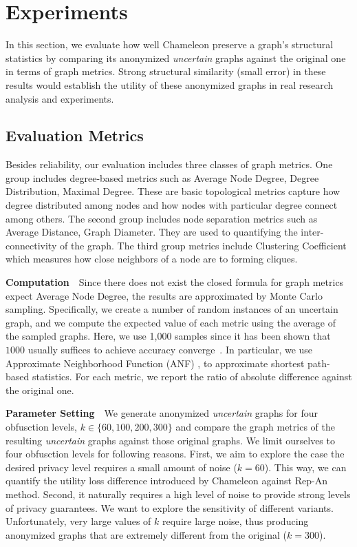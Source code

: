 \section{Experiments}
\label{sec:exp}
In this section, we evaluate how well Chameleon preserve a graph's structural statistics by comparing its anonymized \emph{uncertain} graphs against the original one in terms of graph metrics. Strong structural similarity (small error) in these results would establish the utility of these anonymized graphs in real research analysis and experiments. 

\subsection{Evaluation Metrics}
Besides reliability, our evaluation includes three classes of graph metrics. 
One group includes degree-based metrics such as Average Node Degree, Degree Distribution, Maximal Degree. These are basic topological metrics capture how degree distributed among nodes and how nodes with particular degree connect among others. The second group includes node separation metrics such as Average Distance, Graph Diameter. They are used to quantifying the inter-connectivity of the graph. The third group metrics include Clustering Coefficient which measures how close neighbors of a node are to forming cliques.

\textbf{Computation}~~Since there does not exist the closed formula for graph metrics expect Average Node Degree, the results are approximated by Monte Carlo sampling. Specifically, we create a number of random instances of an  uncertain graph, and we compute the expected value of each metric using the average of the sampled graphs. Here, we use 1,000 samples since it has been shown that $1000$ usually suffices to achieve accuracy converge~\cite{Potamias_K_2010,Jin_Distance_2011}. In particular, we use Approximate Neighborhood Function (ANF) \cite{Boldi_Rosa_Vigna_2011}, to approximate shortest path-based statistics. For each metric, we report the ratio of absolute difference against the original one. 

\textbf{Parameter Setting}~~We generate anonymized \emph{uncertain} graphs for four obfusction levels, $k \in \lbrace 60,100,200,300\rbrace$ and compare the graph metrics of the resulting \emph{uncertain} graphs against those original graphs. We limit ourselves to four obfusction levels for following reasons. 
First, we aim to explore the case the desired privacy level requires a small amount of noise ($k=60$). This way, we can quantify the utility loss difference introduced by Chameleon against Rep-An method. Second, it naturally requires a high level of noise to provide strong levels of privacy guarantees. We want to explore the sensitivity of different variants. Unfortunately, very large values of $k$ require large noise, thus producing anonymized graphs that are extremely different from the original ($k=300$). 


